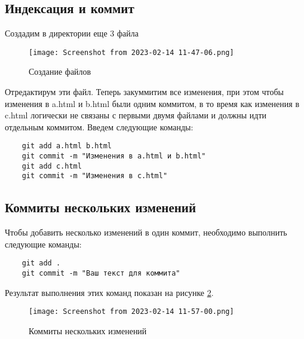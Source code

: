 \subsection{Индексация и коммит}
Создадим в директории еще 3 файла
\begin{figure}[hp]
	\centering
	\texttt{[image: Screenshot from 2023-02-14 11-47-06.png]}
	\caption{Создание файлов}
	\label{fig:git:files}
\end{figure}
Отредактирум эти файл. Теперь  закуммитим все изменения, при этом чтобы изменения в a.html и b.html были одним
коммитом, в то время как изменения в c.html логически не связаны с первыми двумя
файлами и должны идти отдельным коммитом.
Введем следующие команды:
\begin{verbatim}
	git add a.html b.html
	git commit -m "Изменения в a.html и b.html"
	git add c.html
	git commit -m "Изменения в c.html"
\end{verbatim}

\subsection{Коммиты нескольких изменений}
Чтобы добавить несколько изменений в один коммит, необходимо выполнить следующие команды:
\begin{verbatim}
	git add .
	git commit -m "Ваш текст для коммита"
\end{verbatim}
Результат выполнения этих команд показан на рисунке \ref{fig:git:commit}.
\begin{figure}[hp]
	\centering
	\texttt{[image: Screenshot from 2023-02-14 11-57-00.png]}
	\caption{Коммиты нескольких изменений}
	\label{fig:git:commit}
\end{figure}

